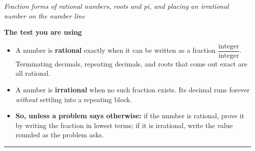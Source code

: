 \documentclass[12pt]{article}
\begin{document}

\begin{center}
\textit{Fraction forms of rational numbers, roots and pi, and placing an irrational
number on the number line}
\end{center}

\noindent\textbf{The test you are using}
\begin{itemize}[leftmargin=0.9cm, itemsep=1pt, topsep=2pt]
  \item A number is \textbf{rational} exactly when it can be written as a fraction
        $\dfrac{\text{integer}}{\text{integer}}$. Terminating decimals, repeating
        decimals, and roots that come out exact are all rational.
  \item A number is \textbf{irrational} when no such fraction exists. Its decimal runs
        forever \emph{without} settling into a repeating block.
  \item \textbf{So, unless a problem says otherwise:} if the number is rational, prove it
        by writing the fraction in lowest terms; if it is irrational, write the value
        rounded as the problem asks.
\end{itemize}

\vspace{0.15cm}
\noindent\rule{\linewidth}{0.4pt}

\vspace{0.15cm}



\end{document}
